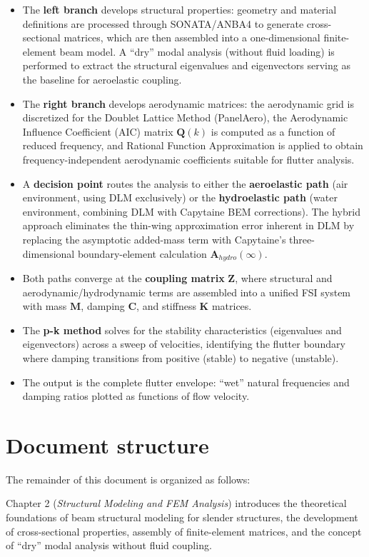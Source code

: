 \begin{itemize}
    \item The \textbf{left branch} develops structural properties: geometry and material definitions are processed through SONATA/ANBA4 to generate cross-sectional matrices, which are then assembled into a one-dimensional finite-element beam model. A ``dry'' modal analysis (without fluid loading) is performed to extract the structural eigenvalues and eigenvectors serving as the baseline for aeroelastic coupling.
    \item The \textbf{right branch} develops aerodynamic matrices: the aerodynamic grid is discretized for the Doublet Lattice Method (PanelAero), the Aerodynamic Influence Coefficient (AIC) matrix $\mathbf{Q}(k)$ is computed as a function of reduced frequency, and Rational Function Approximation is applied to obtain frequency-independent aerodynamic coefficients suitable for flutter analysis.
    \item A \textbf{decision point} routes the analysis to either the \textbf{aeroelastic path} (air environment, using DLM exclusively) or the \textbf{hydroelastic path} (water environment, combining DLM with Capytaine BEM corrections). The hybrid approach eliminates the thin-wing approximation error inherent in DLM by replacing the asymptotic added-mass term with Capytaine's three-dimensional boundary-element calculation $\mathbf{A}_{hydro}(\infty)$.
    \item Both paths converge at the \textbf{coupling matrix} $\mathbf{Z}$, where structural and aerodynamic/hydrodynamic terms are assembled into a unified FSI system with mass $\mathbf{M}$, damping $\mathbf{C}$, and stiffness $\mathbf{K}$ matrices.
    \item The \textbf{p-k method} solves for the stability characteristics (eigenvalues and eigenvectors) across a sweep of velocities, identifying the flutter boundary where damping transitions from positive (stable) to negative (unstable).
    \item The output is the complete flutter envelope: ``wet'' natural frequencies and damping ratios plotted as functions of flow velocity.
\end{itemize}

\newpage
\section{Document structure}
The remainder of this document is organized as follows:

Chapter 2 (\textit{Structural Modeling and FEM Analysis}) introduces the theoretical foundations of beam structural modeling for slender structures, the development of cross-sectional properties, assembly of finite-element matrices, and the concept of ``dry'' modal analysis without fluid coupling.

